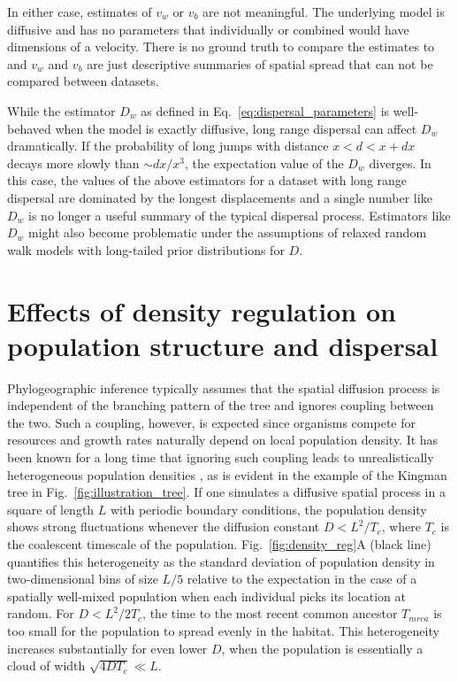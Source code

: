 \documentclass[aps,rmp, twocolumn]{revtex4}
\begin{document}
In either case, estimates of $v_w$ or $v_b$ are not meaningful.
The underlying model is diffusive and has no parameters that individually or combined would have dimensions of a velocity.
There is no ground truth to compare the estimates to and $v_w$ and $v_b$ are just descriptive summaries of spatial spread that can not be compared between datasets.

While the estimator $D_w$ as defined in Eq.~\ref{eq:dispersal_parameters} is well-behaved when the model is exactly diffusive, long range dispersal can affect $D_w$ dramatically.
If the probability of long jumps with distance $x<d<x+dx$ decays more slowly than $\sim dx/x^3$, the expectation value of the $D_w$ diverges.
In this case, the values of the above estimators for a dataset with long range dispersal are dominated by the longest displacements and a single number like $D_w$ is no longer a useful summary of the typical dispersal process.
Estimators like $D_w$ might also become problematic under the assumptions of relaxed random walk models with long-tailed prior distributions for $D$.


\section*{Effects of density regulation on population structure and dispersal}
Phylogeographic inference typically assumes that the spatial diffusion process is independent of the branching pattern of the tree and ignores coupling between the two.
Such a coupling, however, is expected since organisms compete for resources and growth rates naturally depend on local population density.
It has been known for a long time that ignoring such coupling leads to unrealistically heterogeneous population densities \citep{felsenstein_pain_1975}, as is evident in the example of the Kingman tree in Fig.~\ref{fig:illustration_tree}.
If one simulates a diffusive spatial process in a square of length $L$ with periodic boundary conditions, the population density shows strong fluctuations whenever the diffusion constant $D<L^2/T_c$, where $T_c$ is the coalescent timescale of the population.
Fig.~\ref{fig:density_reg}A (black line) quantifies this heterogeneity as the standard deviation of population density in two-dimensional bins of size $L/5$ relative to the expectation in the case of a spatially well-mixed population when each individual picks its location at random.
For $D<L^2/2T_c$, the time to the most recent common ancestor $T_{mrca}$ is too small for the population to spread evenly in the habitat.
This heterogeneity increases substantially for even lower $D$, when the population is essentially a cloud of width $\sqrt{4DT_c}\ll L$.
\end{document}
